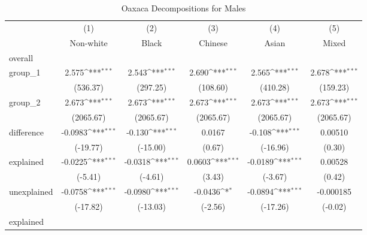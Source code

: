 {
\def\sym#1{\ifmmode^{#1}\else\(^{#1}\)\fi}
\begin{longtable}{l*{5}{c}}
\caption{Oaxaca Decompositions for Males\label{tab1}}\\
\hline\hline\endfirsthead\hline\endhead\hline\endfoot\endlastfoot
            &\multicolumn{1}{c}{(1)}&\multicolumn{1}{c}{(2)}&\multicolumn{1}{c}{(3)}&\multicolumn{1}{c}{(4)}&\multicolumn{1}{c}{(5)}\\
            &\multicolumn{1}{c}{Non-white}&\multicolumn{1}{c}{Black}&\multicolumn{1}{c}{Chinese}&\multicolumn{1}{c}{Asian}&\multicolumn{1}{c}{Mixed}\\
\hline
overall     &                     &                     &                     &                     &                     \\
group\_1     &       2.575\sym{***}&       2.543\sym{***}&       2.690\sym{***}&       2.565\sym{***}&       2.678\sym{***}\\
            &    (536.37)         &    (297.25)         &    (108.60)         &    (410.28)         &    (159.23)         \\
group\_2     &       2.673\sym{***}&       2.673\sym{***}&       2.673\sym{***}&       2.673\sym{***}&       2.673\sym{***}\\
            &   (2065.67)         &   (2065.67)         &   (2065.67)         &   (2065.67)         &   (2065.67)         \\
difference  &     -0.0983\sym{***}&      -0.130\sym{***}&      0.0167         &      -0.108\sym{***}&     0.00510         \\
            &    (-19.77)         &    (-15.00)         &      (0.67)         &    (-16.96)         &      (0.30)         \\
explained   &     -0.0225\sym{***}&     -0.0318\sym{***}&      0.0603\sym{***}&     -0.0189\sym{***}&     0.00528         \\
            &     (-5.41)         &     (-4.61)         &      (3.43)         &     (-3.67)         &      (0.42)         \\
unexplained &     -0.0758\sym{***}&     -0.0980\sym{***}&     -0.0436\sym{*}  &     -0.0894\sym{***}&   -0.000185         \\
            &    (-17.82)         &    (-13.03)         &     (-2.56)         &    (-17.26)         &     (-0.02)         \\
\hline
explained   &                     &                     &                     &                     &                     \\

\end{longtable}}
